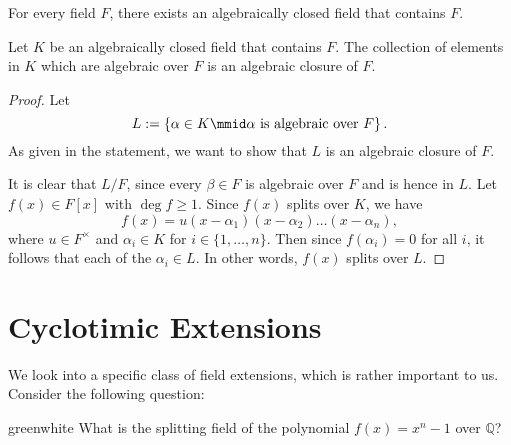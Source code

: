 \documentclass[notoc,notitlepage,nobib]{tufte-book}
\begin{document}
\begin{thm}\label{thm:every_field_has_an_algebraic_closure}
  For every field $F$, there exists an algebraically closed field that contains $F$.
\end{thm}

\begin{thm}\label{thm:smallest_algebraic_closure}
  Let $K$ be an algebraically closed field that contains $F$. The collection of elements
  in $K$ which are algebraic over $F$ is an algebraic closure of $F$.
\end{thm}

\begin{proof}
  Let
  \begin{equation*}
    L := \left\{ \alpha \in K \mmid \alpha \text{ is algebraic over } F \right\}.
  \end{equation*}
  As given in the statement, we want to show that $L$ is an algebraic closure of $F$.

  It is clear that $L / F$, since every $\beta \in F$ is algebraic over $F$ and is hence
  in $L$. Let $f(x) \in F[x]$ with $\deg f \geq 1$. Since $f(x)$ splits over $K$, we have
  \begin{equation*}
    f(x) = u(x - \alpha_1)(x - \alpha_2) \hdots (x - \alpha_n),
  \end{equation*}
  where $u \in F^\times$ and $\alpha_i \in K$ for $i \in \{ 1, \ldots, n \}$. Then since
  $f(\alpha_i) = 0$ for all $i$, it follows that each of the $\alpha_i \in L$. In other
  words, $f(x)$ splits over $L$.
\end{proof}


\section{Cyclotimic Extensions}%
\label{sec:cyclotimic_extensions}

We look into a specific class of field extensions, which is rather important to us.
Consider the following question:

\begin{quotebox}{green}{white}
  What is the splitting field of the polynomial $f(x) = x^n - 1$ over $\mathbb{Q}$?
\end{quotebox}
\end{document}
